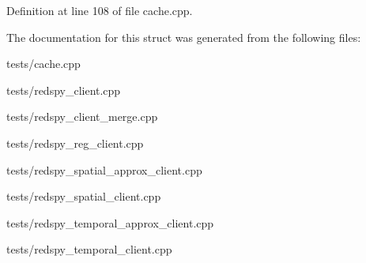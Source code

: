 Definition at line 108 of file cache.\-cpp.



The documentation for this struct was generated from the following files\-:\begin{DoxyCompactItemize}
\item 
tests/cache.\-cpp\item 
tests/redspy\-\_\-client.\-cpp\item 
tests/redspy\-\_\-client\-\_\-merge.\-cpp\item 
tests/redspy\-\_\-reg\-\_\-client.\-cpp\item 
tests/redspy\-\_\-spatial\-\_\-approx\-\_\-client.\-cpp\item 
tests/redspy\-\_\-spatial\-\_\-client.\-cpp\item 
tests/redspy\-\_\-temporal\-\_\-approx\-\_\-client.\-cpp\item 
tests/redspy\-\_\-temporal\-\_\-client.\-cpp\end{DoxyCompactItemize}
